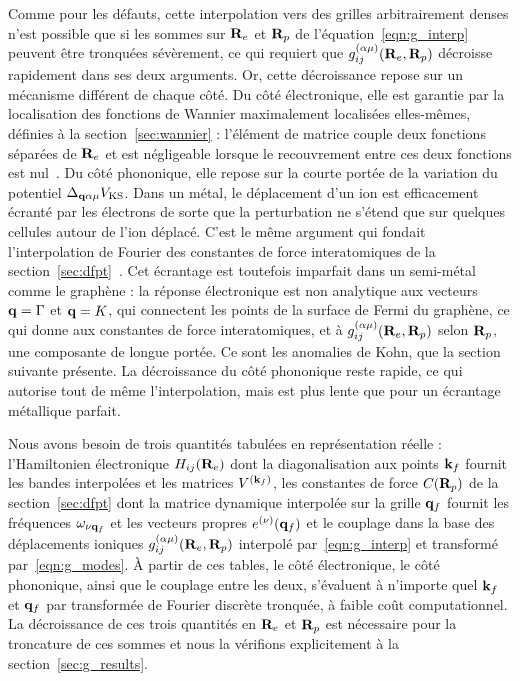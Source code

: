 Comme pour les défauts, cette interpolation vers des grilles arbitrairement denses n'est possible que si les sommes sur $\mathbf{R}_e$ et $\mathbf{R}_p$ de l'équation~\eqref{eqn:g_interp} peuvent être tronquées sévèrement, ce qui requiert que $g_{ij}^{(\alpha\mu)}(\mathbf{R}_e,\mathbf{R}_p)$ décroisse rapidement dans ses deux arguments. Or, cette décroissance repose sur un mécanisme différent de chaque côté. Du côté électronique, elle est garantie par la localisation des fonctions de Wannier maximalement localisées elles-mêmes, définies à la section~\ref{sec:wannier} : l'élément de matrice couple deux fonctions séparées de $\mathbf{R}_e$ et est négligeable lorsque le recouvrement entre ces deux fonctions est nul~\cite{brouderExponentialLocalizationWannier2007,marzariMaximallyLocalizedWannier2012a}. Du côté phononique, elle repose sur la courte portée de la variation du potentiel $\Delta_{\mathbf{q}\alpha\mu}V_\text{KS}$. Dans un métal, le déplacement d'un ion est efficacement écranté par les électrons de sorte que la perturbation ne s'étend que sur quelques cellules autour de l'ion déplacé. C'est le même argument qui fondait l'interpolation de Fourier des constantes de force interatomiques de la section~\ref{sec:dfpt}~\cite{baroniPhononsRelatedCrystal2001a}. Cet écrantage est toutefois imparfait dans un semi-métal comme le graphène : la réponse électronique est non analytique aux vecteurs $\mathbf{q}=\Gamma$ et $\mathbf{q}=K$, qui connectent les points de la surface de Fermi du graphène, ce qui donne aux constantes de force interatomiques, et à $g^{(\alpha\mu)}_{ij}(\mathbf{R}_e,\mathbf{R}_p)$ selon $\mathbf{R}_p$, une composante de longue portée. Ce sont les anomalies de Kohn, que la section suivante présente. La décroissance du côté phononique reste rapide, ce qui autorise tout de même l'interpolation, mais est plus lente que pour un écrantage métallique parfait.

Nous avons besoin de trois quantités tabulées en représentation réelle : l'Hamiltonien électronique $H_{ij}(\mathbf{R}_e)$ dont la diagonalisation aux points $\mathbf{k}_f$ fournit les bandes interpolées et les matrices $V^{(\mathbf{k}_f)}$, les constantes de force $C(\mathbf{R}_p)$ de la section~\ref{sec:dfpt} dont la matrice dynamique interpolée sur la grille $\mathbf{q}_f$ fournit les fréquences $\omega_{\nu\mathbf{q}_f}$ et les vecteurs propres $e^{(\nu)}(\mathbf{q}_f)$ et le couplage dans la base des déplacements ioniques $g_{ij}^{(\alpha\mu)}(\mathbf{R}_e,\mathbf{R}_p)$ interpolé par~\eqref{eqn:g_interp} et transformé par~\eqref{eqn:g_modes}. À partir de ces tables, le côté électronique, le côté phononique, ainsi que le couplage entre les deux, s'évaluent à n'importe quel $\mathbf{k}_f$ et $\mathbf{q}_f$ par transformée de Fourier discrète tronquée, à faible coût computationnel. La décroissance de ces trois quantités en $\mathbf{R}_e$ et $\mathbf{R}_p$ est nécessaire pour la troncature de ces sommes et nous la vérifions explicitement à la section~\ref{sec:g_results}.

